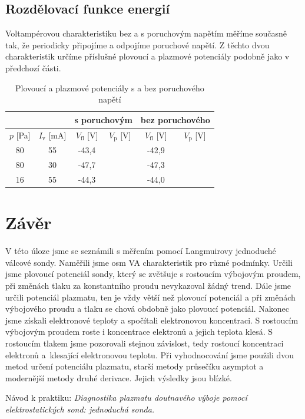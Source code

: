 \documentclass[a4paper,12pt]{article}
\begin{document}
\clearpage
\subsection{Rozdělovací funkce energií}
Voltampérovou charakteristiku bez a s poruchovým napětím měříme současně tak, 
že periodicky připojíme a odpojíme poruchové napětí. Z těchto dvou 
charakteristik určíme příslušné plovoucí a plazmové potenciály podobně jako v 
předchozí části.

\begin{center}
	\begin{table}[h!]
		\centering
		\caption{Plovoucí a plazmové potenciály s a bez poruchového napětí}
		\label{tab3}
		\begin{tabular}{|c|c|c|c|c|c|} \hline
			&&\multicolumn{2}{c|}{s poruchovým}&\multicolumn{2}{c|}{bez 
			poruchového}\\ 
			\hline
			$p$ [\si{\pascal}] & $I_\text{v}$ [\si{\milli\ampere}] &  
			$V_\text{fl}$ [V] & 
			$V_\text{p}$ [V]  &  
			$V_\text{fl}$ [V] & $V_\text{p}$ [V]  \\ \hline
			80&55&-43,4&&-42,9&\\ \hline
			80&30&-47,7&&-47,3&\\ \hline
			16&55&-44,3&&-44,0&\\ \hline
			
		\end{tabular}
	\end{table}
\end{center}

\clearpage
\section{Závěr}
V této úloze jsme se seznámili s měřením pomocí Langmuirovy jednoduché válcové sondy. Naměřili jsme osm VA charakteristik pro různé
podmínky. Určili jsme plovoucí potenciál sondy, který se zvětšuje s rostoucím výbojovým proudem, při změnách tlaku za konstantního
proudu nevykazoval žádný trend. Dále jsme určili potenciál plazmatu, ten je vždy větší než plovoucí potenciál a při změnách výbojového
proudu a tlaku se chová obdobně jako plovoucí potenciál. Nakonec jsme získali elektronové teploty a spočítali elektronovou koncentraci. S rostoucím výbojovým
proudem roste i koncentrace elektronů a jejich teplota klesá. S rostoucím tlakem jsme pozorovali stejnou závislost, tedy rostoucí
koncentraci elektronů a~klesající elektronovou teplotu. Při vyhodnocování jsme 
použili dvou metod určení potenciálu plazmatu, starší metody průsečíku asymptot 
a modernější metody druhé derivace. Jejich výsledky jsou blízké.

\begin{thebibliography}{10}
	 Návod k praktiku: \textit{Diagnostika plazmatu doutnavého výboje pomocí 
	elektrostatických sond: jednoduchá sonda.}

\end{thebibliography}
\end{document}
